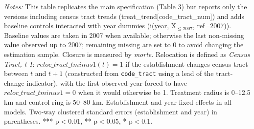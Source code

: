 \begin{supptable}[H]
{\begin{threeparttable}
   	\begin{tablenotes}[flushleft] \item \small \textit{Notes:} This table replicates the main specification (Table 3) but reports only the versions including census tract trends (treat\_trend[code\_tract\_num]) and adds baseline controls interacted with year dummies (i(year, X$_{\le 2007}$, ref=2007)). Baseline values are taken in 2007 when available; otherwise the last non-missing value observed up to 2007; remaining missing are set to 0 to avoid changing the estimation sample. Closure is measured by \textit{morte}. Relocation is defined as \textit{Census Tract, t-1}: $reloc\_tract\_tminus1(t)=1$ if the establishment changes census tract between $t$ and $t+1$ (constructed from \texttt{code\_tract} using a lead of the tract-change indicator), with the first observed year forced to have $reloc\_tract\_tminus1=0$ when it would otherwise be 1. Treatment radius is 0--12.5 km and control ring is 50--80 km. Establishment and year fixed effects in all models. Two-way clustered standard errors (establishment and year) in parentheses. *** p$<$0.01, ** p$<$0.05, * p$<$0.1.
   	\end{tablenotes}
   	\end{threeparttable}
   	}
\end{supptable}%
